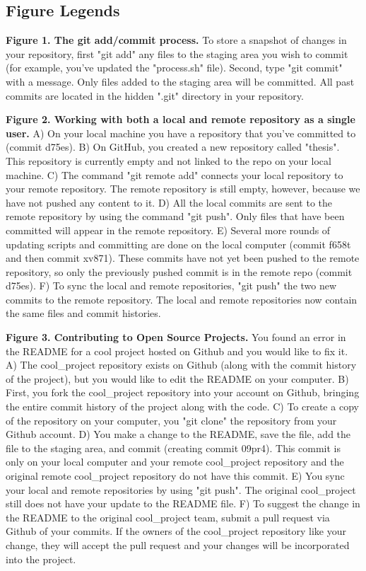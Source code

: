 \subsection{Figure Legends}

\textbf{Figure 1. The git add/commit process.}
To store a snapshot of changes in your repository, first "git add" any files to the staging area you wish to commit (for example, you've updated the "process.sh" file).
Second, type "git commit" with a message. Only files added to the staging area will be committed.
All past commits are located in the hidden ".git" directory in your repository.

\textbf{Figure 2. Working with both a local and remote repository as a single user.}
A) On your local machine you have a repository that you've committed to (commit d75es).
B) On GitHub, you created a new repository called "thesis". This repository is currently empty and not linked to the repo on your local machine.
C) The command "git remote add" connects your local repository to your remote repository.
The remote repository is still empty, however, because we have not pushed any content to it.
D) All the local commits are sent to the remote repository by using the command "git push".
Only files that have been committed will appear in the remote repository.
E) Several more rounds of updating scripts and committing are done on the local computer (commit f658t and then commit xv871).
These commits have not yet been pushed to the remote repository, so only the previously pushed commit is in the remote repo (commit d75es).
F) To sync the local and remote repositories, "git push" the two new commits to the remote repository.
The local and remote repositories now contain the same files and commit histories.

\textbf{Figure 3. Contributing to Open Source Projects.}
You found an error in the README for a cool project hosted on Github and you would like to fix it.
A) The cool\_project repository exists on Github (along with the commit history of the project), but you would like to edit the README on your computer.
B) First, you fork the cool\_project repository into your account on Github, bringing the entire commit history of the project along with the code.
C) To create a copy of the repository on your computer, you "git clone" the repository from your Github account.
D) You make a change to the README, save the file, add the file to the staging area, and commit (creating commit 09pr4).
This commit is only on your local computer and your remote cool\_project repository and the original remote cool\_project repository do not have this commit.
E) You sync your local and remote repositories by using "git push".
The original cool\_project still does not have your update to the README file.
F) To suggest the change in the README to the original cool\_project team, submit a pull request via Github of your commits.
If the owners of the cool\_project repository like your change, they will accept the pull request and your changes will be incorporated into the project.

